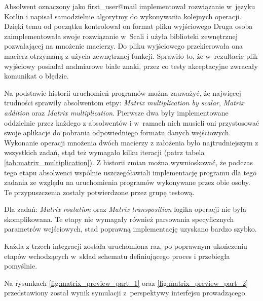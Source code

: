 









Absolwent oznaczony jako first\_user@mail implementował rozwiązanie w~języku Kotlin i napisał samodzielnie algorytmy do wykonywania kolejnych operacji.
Dzięki temu od początku kontrolował on format pliku wyjściowego
Druga osoba zaimplementowała swoje rozwiązanie w~Scali i użyła biblioteki zewnętrznej pozwalającej na mnożenie macierzy.
Do pliku wyjściowego przekierowała ona macierz otrzymaną z użycia zewnętrznej funkcji.
Sprawiło to, że w~rezultacie plik wyjściowy posiadał nadmiarowe białe znaki, przez co testy akceptacyjne zwracały komunikat o błędzie.


Na podstawie historii uruchomień programów można zauważyć, że najwięcej trudności sprawiły absolwentom etpy: \textit{Matrix multiplication by scalar}, \textit{Matrix addition} oraz \textit{Matrix multiplication}.
Pierwsze dwa były implementowane oddzielnie przez każdego z absolwentów i w~ramach nich musieli oni przystosować swoje aplikacje do pobrania odpowiedniego formatu danych wejściowych.
Wykonanie operacji mnożenia dwóch macierzy z założenia było najtrudniejszym z wszystkich zadań, stąd też wymagało kilku iteracji (patrz tabela \ref{tab:matrix_multiplication}).
Z historii zmian można wywnioskować, że podczas tego etapu absolwenci wspólnie uszczegóławiali implementację programu dla tego zadania ze względu na uruchomienia programów wykonywane przez obie osoby.
Te przypuszczenia zostały potwierdzone przez grupę testową.

Dla zadań: \textit{Matrix roatation} oraz \textit{Matrix transposition} logika operacji nie była skomplikowana.
Te etapy nie wymagały również parsowania specyficznych parametrów wejściowych, stad poprawną implementację uzyskano bardzo szybko.

Każda z trzech integracji została uruchomiona raz, po poprawnym ukończeniu etapów wchodzących w~skład schematu definiującego proces i przebiegła pomyślnie.

Na rysunkach \ref{fig:matrix_preview_part_1} oraz \ref{fig:matrix_preview_part_2} przedstawiony został wynik symulacji z~perspektywy interfejsu prowadzącego.

